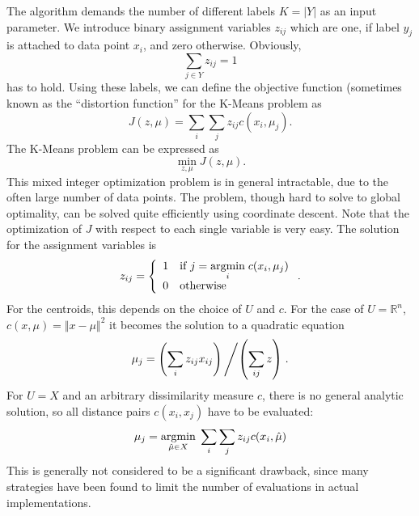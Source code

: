 The algorithm demands the number of different labels $K=|Y|$ as an input parameter.
We introduce binary assignment variables $z_{ij}$ which are one, if label $y_j$ is attached to data point $x_i$, and zero otherwise. 
Obviously, 
\[\sum_{j\in Y}z_{ij} = 1\]
has to hold.
Using these labels, we can define the objective function (sometimes known as the ``distortion function'' for the K-Means problem as
\begin{equation}
  \label{eq:5}
  J(z, \mu) = \sum_{i}\sum_{j}z_{ij}c(x_i, \mu_j).
\end{equation}
The K-Means problem can be expressed as
\begin{equation}
  \label{eq:3}
  \min\limits_{z, \mu}J(z, \mu).
\end{equation}
This mixed integer optimization problem is in general intractable, due to the often large number of data points.
The problem, though hard to solve to global optimality, can be solved quite efficiently using coordinate descent.
Note that the optimization of $J$ with respect to each single variable is very easy.
The solution for the assignment variables is
\begin{equation}
  \label{eq:4}
  z_{ij} = \left\{\begin{array}{ll}1&\text{if }j=\underset{i}{\operatorname{argmin}}\; c(x_i,\mu_j)\\0&\text{otherwise} \end{array}\right. .
\end{equation}
For the centroids, this depends on the choice of $U$ and $c$.
For the case of $U=\mathbb{R}^n$, $c(x,\mu) = \Vert x-\mu\Vert^2$ it becomes the solution to a quadratic equation
\begin{equation}
  \label{eq:6}
  \mu_j = \left(\sum_{i}z_{ij}x_{ij}\right)\left / \left(\sum_{ij}z\right)\right. .
\end{equation}
For $U=X$ and an arbitrary dissimilarity measure $c$, there is no general analytic solution, so all distance pairs $c(x_i, x_j)$ have to be evaluated:
\begin{equation}
  \label{eq:7}
  \mu_j = \underset{\hat{\mu}\in X}{\operatorname{argmin}}\; \sum_{i}\sum_{j}z_{ij}c(x_i,\hat{\mu})
\end{equation}
This is generally not considered to be a significant drawback, since many strategies have been found to limit the number of evaluations in actual implementations.


